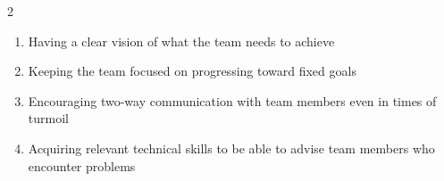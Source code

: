 \documentclass[12pt]{article}
\begin{document}
\begin{enumerate}[label=\textbf{\arabic*.}]
\begin{multicols}{2}
\begin{enumerate}[label=(\Alph*)]
\item Having a clear vision of what the team needs to achieve

\item Keeping the team focused on progressing toward fixed goals

\item Encouraging two-way communication with team members even in times of turmoil

\item Acquiring relevant technical skills to be able to advise team members who encounter problems

\end{enumerate}

\end{multicols}
\end{enumerate}

\noindent {} \hfill {}
\end{document}
